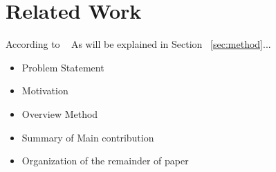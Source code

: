 \section{Related Work}
\label{sec:relatedwork}


According to ~\cite{durmus2023towards}
As will be explained in Section ~\ref{sec:method}...
\begin{itemize}
    \item Problem Statement
    \item Motivation
    \item Overview Method
    \item Summary of Main contribution %
    \item Organization of the remainder of paper
\end{itemize}